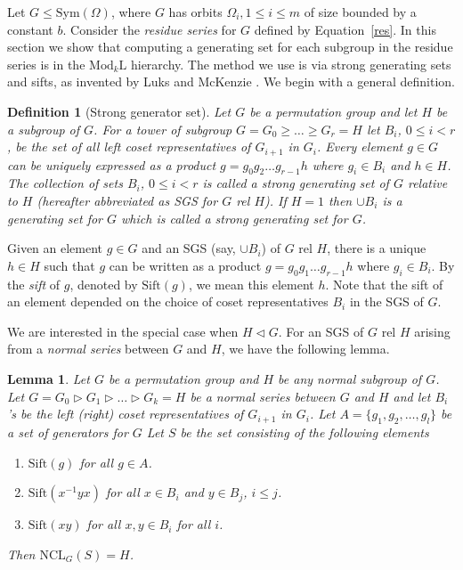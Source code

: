 \documentclass[11pt]{article}
\newtheorem{lemma}[theorem]{Lemma}
\newtheorem{definition}[theorem]{Definition}
\newcommand{\Mod}[1]{\ensuremath{\mathrm{Mod}_{#1}\mathrm{L}}}
\newcommand{\Sift}[1]{\ensuremath{\mathrm{Sift}({#1})}}
\newcommand{\NCL}[2]{\ensuremath{\mathrm{NCL}_{#1}({#2})}}
\newcommand{\Sym}[1]{\ensuremath{\mathrm{Sym}\left({#1}\right)}}
\begin{document}
Let $G\leq\Sym{\Omega}$, where $G$ has orbits $\Omega_i, 1\leq i\leq
m$ of size bounded by a constant $b$. Consider the \emph{residue
series} for $G$ defined by Equation~\ref{res}. In this section we show
that computing a generating set for each subgroup in the residue
series is in the $\Mod{k}$ hierarchy. The method we use is via strong
generating sets and sifts, as invented by Luks and McKenzie
\cite{LM,luks}. We begin with a general definition.
  
\begin{definition}[Strong generator set]
  Let $G$ be a permutation group and let $H$ be a subgroup of $G$. For
  a tower of subgroup $G = G_0 \geq \ldots \geq G_r = H$ let $B_i$, $0
  \leq i < r$, be the set of all left coset representatives of
  $G_{i+1}$ in $G_i$. Every element $g \in G$ can be uniquely
  expressed as a product $g = g_0g_2\ldots g_{r-1}h$ where $g_i \in
  B_i$ and $h \in H$. The collection of sets $B_i$, $0 \leq i < r$ is
  called a \emph{strong generating set} of $G$ relative to $H$
  (hereafter abbreviated as SGS for $G$ rel $H$). If $H =1$ then $\cup
  B_i$ is a generating set for $G$ which is called a strong generating
  set for $G$.
\end{definition}

Given an element $g \in G$ and an SGS (say, $\cup B_i$) of $G$ rel
$H$, there is a unique $h \in H$ such that $g$ can be written as a
product $g = g_0 g_1 \ldots g_{r-1}h$ where $g_i \in B_i$. By the
\emph{sift} of $g$, denoted by $\Sift{g}$, we mean this element
$h$. Note that the sift of an element depended on the choice of coset
representatives $B_i$ in the SGS of $G$.

We are interested in the special case when $H \lhd G$. For an SGS of
$G$ rel $H$ arising {from} a \emph{normal series} between $G$ and $H$,
we have the following lemma.

\begin{lemma}\label{lem-sift}
  Let $G$ be a permutation group and $H$ be any normal subgroup of
  $G$. Let $G = G_0 \rhd G_1\rhd \ldots \rhd G_k = H$ be a normal series
  between $G$ and $H$ and let $B_i$'s be the left (right) coset
  representatives of $G_{i+1}$ in $G_i$.  Let $A = \{
  g_1,g_2,\ldots,g_l\}$ be a set of generators for $G$ Let $S$ be the
  set consisting of the following elements
\begin{enumerate}
  \item $\Sift{g}$ for all $g \in A$.
  \item \label{prop-commutator}$\Sift{x^{-1}yx}$ for all $x \in B_i$ and
    $y \in B_j$, $i \leq j$.
  \item \label{prop-product} $\Sift{xy}$ for all $x,y \in B_i$ for all
    $i$.
\end{enumerate}
Then $\NCL{G}{S} = H$.
\end{lemma}
\end{document}
